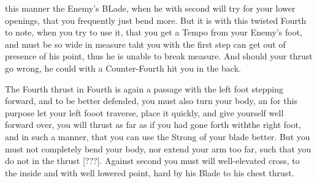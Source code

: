 this manner the Enemy's BLade, when he with second will try for your
lower openings, that you frequently just bend more.
But it is with this twisted Fourth to note, when you try to use it,
that you get a Tempo from your Enemy's foot, and must be so wide in
measure taht you with the first step can get out of presence of his
point, thus he is unable to break measure. And should your thrust go
wrong, he could with a Counter-Fourth hit you in the back.


The Fourth thrust in Fourth is again a passage with the left foot
stepping forward, and to be better defended, you must also turn your
body, an for this purpose let your left fooot traverse, place it
quickly, and give yourself well forward over,
you will thrust as far as if you had gone forth withthe right foot,
and in such a manner, that you can use the Strong of your blade better.
But you must not completely bend your  body, nor extend your arm too
far, such that you do not in the thrust [???]. Against second you must
will well-elevated cross, to the inside and with well lowered point,
hard by his Blade to his chest thrust.
